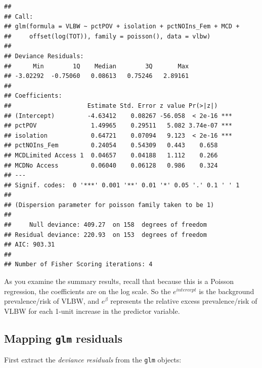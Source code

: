 \documentclass[
]{book}
\newenvironment{Shaded}{\begin{snugshade}}{\end{snugshade}}
\newcommand{\AttributeTok}[1]{\textcolor[rgb]{0.77,0.63,0.00}{#1}}
\newcommand{\FunctionTok}[1]{\textcolor[rgb]{0.00,0.00,0.00}{#1}}
\newcommand{\NormalTok}[1]{#1}
\newcommand{\OtherTok}[1]{\textcolor[rgb]{0.56,0.35,0.01}{#1}}
\newcommand{\SpecialCharTok}[1]{\textcolor[rgb]{0.00,0.00,0.00}{#1}}
\newcommand{\StringTok}[1]{\textcolor[rgb]{0.31,0.60,0.02}{#1}}
\begin{document}
\begin{verbatim}
## 
## Call:
## glm(formula = VLBW ~ pctPOV + isolation + pctNOIns_Fem + MCD + 
##     offset(log(TOT)), family = poisson(), data = vlbw)
## 
## Deviance Residuals: 
##      Min        1Q    Median        3Q       Max  
## -3.02292  -0.75060   0.08613   0.75246   2.89161  
## 
## Coefficients:
##                     Estimate Std. Error z value Pr(>|z|)    
## (Intercept)         -4.63412    0.08267 -56.058  < 2e-16 ***
## pctPOV               1.49965    0.29511   5.082 3.74e-07 ***
## isolation            0.64721    0.07094   9.123  < 2e-16 ***
## pctNOIns_Fem         0.24054    0.54309   0.443    0.658    
## MCDLimited Access 1  0.04657    0.04188   1.112    0.266    
## MCDNo Access         0.06040    0.06128   0.986    0.324    
## ---
## Signif. codes:  0 '***' 0.001 '**' 0.01 '*' 0.05 '.' 0.1 ' ' 1
## 
## (Dispersion parameter for poisson family taken to be 1)
## 
##     Null deviance: 409.27  on 158  degrees of freedom
## Residual deviance: 220.93  on 153  degrees of freedom
## AIC: 903.31
## 
## Number of Fisher Scoring iterations: 4
\end{verbatim}

As you examine the summary results, recall that because this is a Poisson regression, the coefficients are on the log scale. So the \(e^{intercept}\) is the background prevalence/risk of VLBW, and \(e^\beta\) represents the relative excess prevalence/risk of VLBW for each 1-unit increase in the predictor variable.

\hypertarget{mapping-glm-residuals}{%
\subsection{\texorpdfstring{Mapping \texttt{glm} residuals}{Mapping glm residuals}}\label{mapping-glm-residuals}}

First extract the \emph{deviance residuals} from the \texttt{glm} objects:

\begin{Shaded}
\end{Shaded}
\end{document}
